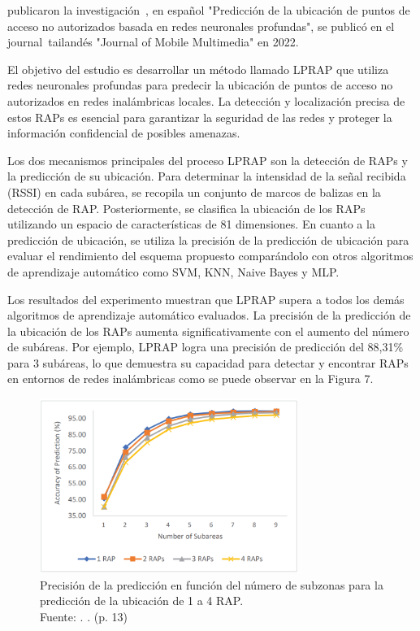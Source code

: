 \newpage
\cite{pr_ketkhaw2019deepl}  publicaron la investigación , en español "Predicción de la ubicación de puntos de acceso no autorizados basada en redes neuronales profundas", se publicó en el journal tailandés "Journal of Mobile Multimedia" en 2022.

El objetivo del estudio es desarrollar un método llamado LPRAP que utiliza redes neuronales profundas para predecir la ubicación de puntos de acceso no autorizados en redes inalámbricas locales. La detección y localización precisa de estos RAPs es esencial para garantizar la seguridad de las redes y proteger la información confidencial de posibles amenazas.

Los dos mecanismos principales del proceso LPRAP son la detección de RAPs y la predicción de su ubicación. Para determinar la intensidad de la señal recibida (RSSI) en cada subárea, se recopila un conjunto de marcos de balizas en la detección de RAP. Posteriormente, se clasifica la ubicación de los RAPs utilizando un espacio de características de 81 dimensiones. En cuanto a la predicción de ubicación, se utiliza la precisión de la predicción de ubicación para evaluar el rendimiento del esquema propuesto comparándolo con otros algoritmos de aprendizaje automático como SVM, KNN, Naive Bayes y MLP.

Los resultados del experimento muestran que LPRAP supera a todos los demás algoritmos de aprendizaje automático evaluados. La precisión de la predicción de la ubicación de los RAPs aumenta significativamente con el aumento del número de subáreas. Por ejemplo, LPRAP logra una precisión de predicción del 88,31\% para 3 subáreas, lo que demuestra su capacidad para detectar y encontrar RAPs en entornos de redes inalámbricas como se puede observar en la Figura 7.

\begin{figure}[!ht]
	\begin{center}
		\includegraphics[width=0.75\textwidth]{2/figures/ketkha2022.png}
		\caption[Precisión de la predicción en función del número de subzonas para la predicción de la ubicación de 1 a 4 RAP.]{Precisión de la predicción en función del número de subzonas para la predicción de la ubicación de 1 a 4 RAP.\\
		Fuente: \cite{pr_ketkhaw2019deepl}. . (p. 13)}
		\label{2:fig115}
	\end{center}
\end{figure}

